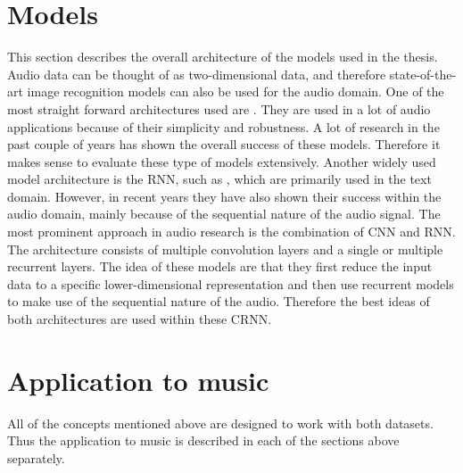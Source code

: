 \section{Models}
\label{sec:Models}
This section describes the overall architecture of the models used in the thesis. Audio data can be thought of as two-dimensional data, and therefore state-of-the-art image recognition models can also be used for the audio domain.
\newline
\newline
One of the most straight forward architectures used are . They are used in a lot of audio applications because of their simplicity and robustness. A lot of research in the past couple of years has shown the overall success of these models. Therefore it makes sense to evaluate these type of models extensively. 
\newline
\newline
Another widely used model architecture is the \gls{RNN}, such as , which are primarily used in the text domain. However, in recent years they have also shown their success within the audio domain, mainly because of the sequential nature of the audio signal.
\newline
\newline
The most prominent approach in audio research is the combination of \gls{CNN} and \gls{RNN}. The architecture consists of multiple convolution layers and a single or multiple recurrent layers. The idea of these models are that they first reduce the input data to a specific lower-dimensional representation and then use recurrent models to make use of the sequential nature of the audio. Therefore the best ideas of both architectures are used within these \gls{CRNN}.

\section{Application to music}
\label{sec:Application-Music}
All of the concepts mentioned above are designed to work with both datasets. Thus the application to music is described in each of the sections above separately.

